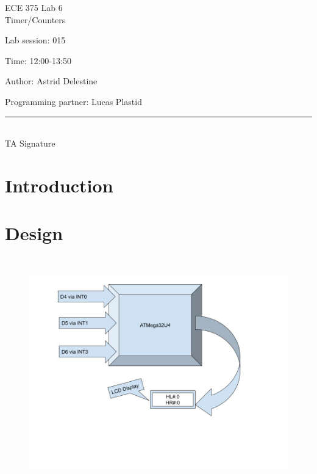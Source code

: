 \documentclass[12pt,letterpaper]{article}
\begin{document}
\begin{titlepage}
    \vspace*{4cm}
    \begin{flushright}
    {\huge
        ECE 375 Lab 6\\[1cm]
    }
    {\large
    	Timer/Counters
    }
    \end{flushright}
    \begin{flushleft}
    Lab session: 015
    
    Time: 12:00-13:50
    \end{flushleft}
    \begin{flushright}
    Author: Astrid Delestine

    Programming partner: Lucas Plastid 

    \vfill
    \rule{5in}{.5mm}\\
    TA Signature
    \end{flushright}

\end{titlepage}

\section{Introduction}


\section{Design}

\begin{figure}[h]
	\includegraphics[width=12cm, height=10cm]{Block Diagram L5.jpg}
	\centering
\end{figure}
	
\end{document}
